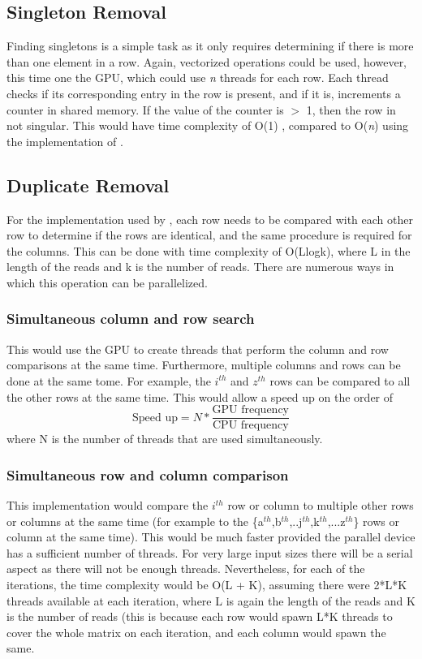 \documentclass[10pt,twocolumn]{witseiepaper}
\begin{document}
\subsection{Singleton Removal}

Finding singletons is a simple task as it only requires determining if there is more than one element in a
row. Again, vectorized operations could be used, however, this time one the GPU, which could use \textit{n}
threads for each row. Each thread checks if its corresponding entry in the row is present, and if it is,
increments a counter in shared memory. If the value of the counter is $>$ 1, then the row in not singular.
This would have time complexity of O(1) , compared to O(\textit{n}) using the implementation of
\cite{chen:2013}.

\subsection{Duplicate Removal}

For the implementation used by \cite{chen:2013}, each row needs to be compared with each other row to
determine if the rows are identical, and the same procedure is required for the columns. This can be done with
time complexity of O(Llogk), where L in the length of the reads and k is the number of reads. There are
numerous ways in which this operation can be parallelized.

\subsubsection{Simultaneous column and row search} This would use the GPU to create threads that perform the
column and row comparisons at the same time. Furthermore, multiple columns and rows can be done at the same
tome. For example, the $i^{th}$ and $z^{th}$ rows can be compared to all the other rows at the same time. This
would allow a speed up on the order of
\begin{equation}
    \textrm{Speed up} = N * \frac{\textrm{GPU frequency}}{\textrm{CPU frequency}}
\end{equation}
where N is the number of threads that are used simultaneously.

\subsubsection{Simultaneous row and column comparison} This implementation would compare the $i^{th}$ row or
column to multiple other rows or columns at the same time (for example to the
\{a$^{th}$,b$^{th}$,..j$^{th}$,k$^{th}$,...z$^{th}$\} rows or column at the same time). This would be much
faster provided the parallel device has a sufficient number of threads. For very large input sizes there will
be a serial aspect as there will not be enough threads. Nevertheless, for each of the iterations, the time
complexity would be O(L + K), assuming there were 2*L*K threads available at each iteration, where L is again
the length of the reads and K is the number of reads (this is because each row would spawn L*K threads to
cover the whole matrix on each iteration, and each column would spawn the same.
\end{document}

